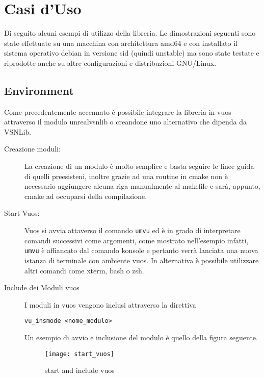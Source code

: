 

\chapter{Casi d'Uso}                %
\lhead[\fancyplain{}{\bfseries\thepage}]{\fancyplain{}{\bfseries\rightmark}}
Di seguito alcuni esempi di utilizzo della libreria.
Le dimostrazioni seguenti sono state effettuate su una macchina con architettura amd64 e con installato il sistema operativo debian in versione sid (quindi unstable) ma sono state testate e riprodotte anche su altre configurazioni e distribuzioni GNU/Linux.
\section{Environment}
Come precedentemente accennato \`e possibile integrare la libreria in vuos attraverso il modulo unrealvsnlib o creandone uno alternativo che dipenda da VSNLib.\\
\begin{description}
\item[Creazione moduli:] La creazione di un modulo \`e molto semplice e basta seguire le linee guida di quelli preesisteni, inoltre grazie ad una routine in cmake non \`e necessario aggiungere alcuna riga manualmente al makefile e sar\`a, appunto, cmake ad occuparsi della compilazione.
\item[Start Vuos:] Vuos si avvia attaverso il comando {\tt umvu} ed \`e in grado di interpretare comandi successivi come argomenti, come mostrato nell'esempio infatti, {\tt umvu} \`e affiancato dal comando konsole e pertanto verr\`a lanciata una nuova istanza di terminale con ambiente vuos.
In alternativa \`e possibile utilizzare altri comandi come xterm, bash o zsh.
\item[Include dei Moduli vuos] I moduli in vuos vengono inclusi attraverso la direttiva
\begin{verbatim}
vu_insmode <nome_modulo>
\end{verbatim}
Un esempio di avvio e inclusione del modulo \`e quello della figura seguente.
\begin{figure}[h]                       %
\begin{center}                          %
\texttt{[image: start\_vuos]}%
%
\caption[start/include\_mod vuos]{start and include vuos}\label{fig:start_vuos}
\end{center}
\end{figure}
\end{description}

